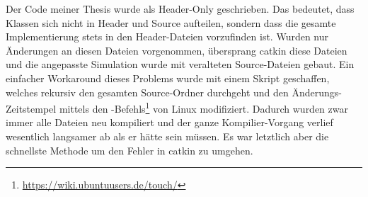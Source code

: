 Der Code meiner Thesis wurde als Header-Only geschrieben. Das bedeutet, dass Klassen sich nicht in Header und Source aufteilen, sondern dass die gesamte Implementierung stets in den Header-Dateien vorzufinden ist. Wurden nur Änderungen an diesen Dateien vorgenommen, übersprang catkin diese Dateien und die angepasste Simulation wurde mit veralteten Source-Dateien gebaut. Ein einfacher Workaround dieses Problems wurde mit einem Skript geschaffen, welches rekursiv den gesamten Source-Ordner durchgeht und den Änderungs-Zeitstempel mittels den -Befehls\footnote{\url{https://wiki.ubuntuusers.de/touch/}} von Linux modifiziert. Dadurch wurden zwar immer alle Dateien neu kompiliert und der ganze Kompilier-Vorgang verlief wesentlich langsamer ab als er hätte sein müssen. Es war letztlich aber die schnellste Methode um den Fehler in catkin zu umgehen.
